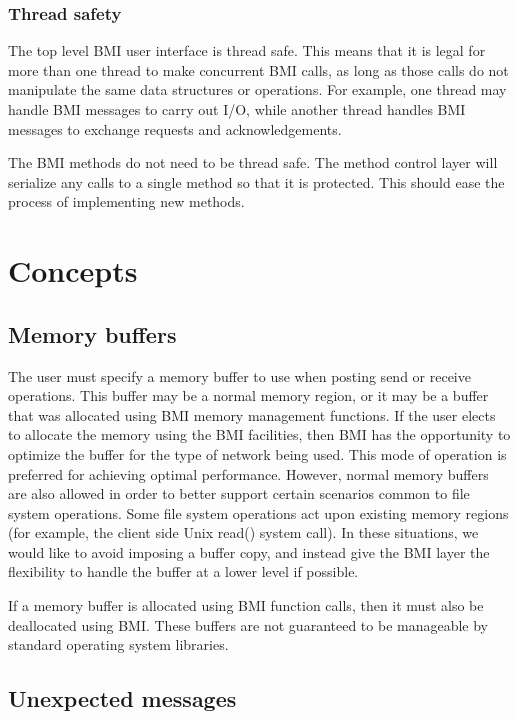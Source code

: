 \documentclass[11pt]{article}
\begin{document}
\subsubsection{Thread safety}

The top level BMI user interface is thread safe.  This means that
it is legal for more than one thread to make concurrent BMI calls,
as long as those calls do not manipulate the same data structures
or operations.  For example, one thread may handle BMI messages to
carry out I/O, while another thread handles BMI messages to
exchange requests and acknowledgements.

The BMI methods do not need to be thread safe.  The method control
layer will serialize any calls to a single method so that it is
protected.  This should ease the process of implementing new
methods.

\section{Concepts}

\subsection{Memory buffers}

The user must specify a memory buffer to use when posting send or
receive operations.  This buffer may be a normal memory region, or it
may be a buffer that was allocated using BMI memory management functions.
If the user elects to allocate the memory using the BMI facilities, then
BMI has the opportunity to optimize the buffer for the type of network
being used.  This mode of operation is preferred for achieving optimal
performance.  However, normal memory buffers are also allowed in order
to better support certain scenarios common to file system operations.
Some file system operations act upon existing memory regions (for example,
the client side Unix read() system call).  In these situations, we would
like to avoid imposing a buffer copy, and instead give the BMI layer
the flexibility to handle the buffer at a lower level if possible.

If a memory buffer is allocated using BMI function calls, then it must
also be deallocated using BMI.  These buffers are not guaranteed to be
manageable by standard operating system libraries.

\subsection{Unexpected messages}
\label{sec:unexp}
\end{document}
